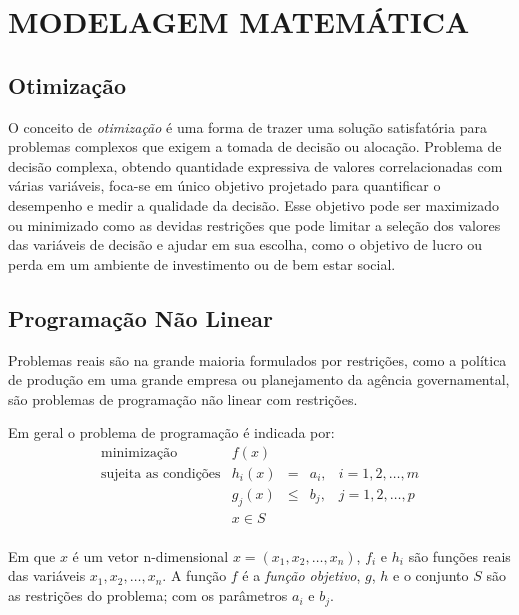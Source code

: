 
\chapter{MODELAGEM MATEMÁTICA}
\label{chap:modelagem_matematica}

\section{Otimização}

O conceito de \textit{otimização} é uma forma de trazer uma solução satisfatória para problemas complexos que exigem a tomada de decisão ou alocação. Problema de decisão complexa, obtendo quantidade expressiva de valores correlacionadas com várias variáveis, foca-se em único objetivo projetado para quantificar o desempenho e medir a qualidade da decisão. Esse objetivo pode ser maximizado ou minimizado como as devidas restrições que pode limitar a seleção dos valores das variáveis de decisão e ajudar em sua escolha, como o objetivo de lucro ou perda em um ambiente de investimento ou de bem estar social. \cite{Luenberger2016}

\section{Programação Não Linear}

Problemas reais são na grande maioria formulados por restrições, como a política de produção em uma grande empresa ou planejamento da agência governamental, são problemas de programação não linear com restrições.

Em geral o problema de programação é indicada por:
\begin{equation}
\begin{array}{rcccc}
\mbox{minimização} & f(x) & & & \\
\mbox{sujeita as condições} & h_{i}(x)&=&a_{i}, & i=1,2,\ldots,m \\
& g_ {j}(x)&\leq&b_j, & j=1,2,\ldots,p\\
& x\in S & & & \\
\end{array}
\end{equation}

Em que $x$ é um vetor n-dimensional $x=(x_{1},x_{2},\ldots,x_{n})$, $f_{i}$ e $h_i$ são funções reais das variáveis $x_{1},x_{2},\ldots,x_{n}$. A função $f$ é a \textit{função objetivo}, $g$, $h$ e o conjunto $S$ são as restrições do problema; com os parâmetros $a_i$ e $b_j$. \cite{Luenberger2016, Rocha2009a}

